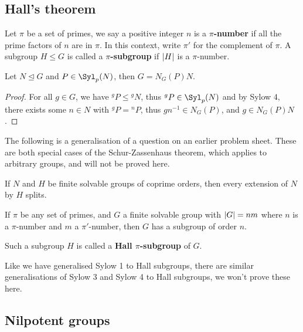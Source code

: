 \documentclass{article}
\begin{document}
\subsection{Hall's theorem}

\begin{definition}
    Let $\pi$ be a set of primes, we say a positive integer $n$ is a \textbf{$\pi$-number} if all the prime factors of $n$ are in $\pi$. In this context, write $\pi'$ for the complement of $\pi$. A subgroup $H\leq G$ is called a \textbf{$\pi$-subgroup} if $\left| H \right|$ is a $\pi$-number.
\end{definition}

\begin{proposition}
    Let $N\unlhd G$ and $P\in\Syl_p(N)$, then $G=N_G(P)N$.
    \begin{proof}
        For all $g\in G$, we have ${}^gP\leq{}^gN$, thus ${}^gP\in\Syl_p(N)$ and by Sylow $4$, there exists some $n\in N$ with ${}^gP={}^nP$, thus $gn^{-1}\in N_G(P)$, and $g\in N_G(P)N$.
    \end{proof}
\end{proposition}

The following is a generalisation of a question on an earlier problem sheet. These are both special cases of the Schur-Zassenhaus theorem, which applies to arbitrary groups, and will not be proved here.

\begin{theorem}
    If $N$ and $H$ be finite solvable groups of coprime orders, then every extension of $N$ by $H$ splits.
\end{theorem}

\begin{theorem}[Hall 1]
    If $\pi$ be any set of primes, and $G$ a finite solvable group with $\left| G \right|=nm$ where $n$ is a $\pi$-number and $m$ a $\pi'$-number, then $G$ has a subgroup of order $n$.
\end{theorem}

\begin{definition}
    Such a subgroup $H$ is called a \textbf{Hall $\pi$-subgroup} of $G$.
\end{definition}

Like we have generalised Sylow 1 to Hall subgroups, there are similar generalisations of Sylow 3 and Sylow 4 to Hall subgroups, we won't prove these here.

\newpage

\subsection{Nilpotent groups}
\end{document}
